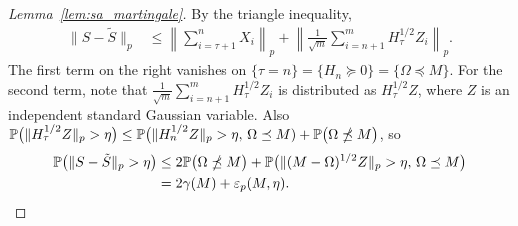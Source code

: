 \begin{proof}[Lemma~\ref{lem:sa_martingale}]
  By the triangle inequality,
  \begin{align*}
    \|S - \tilde S \|_p
    &\leq
    \left\| \sum_{i=\tau+1}^n  X_i \right\|_p
    + \left\| \frac{1}{\sqrt{m}} \sum_{i=n+1}^m H_\tau^{1/2} Z_i \right\|_p.
  \end{align*}
  The first term on the right vanishes on
  $\{\tau = n\} = \{H_n \succeq 0\} = \{\Omega \preceq M\}$.
  For the second term, note that
  $\tfrac{1}{\sqrt{m}}\sum_{i=n+1}^m H_\tau^{1/2} Z_i$
  is distributed as $H_\tau^{1/2}Z$,
  where $Z$ is an independent standard Gaussian variable.
  Also
  $\P\big( \| H_\tau^{1/2} Z \|_p > \eta \big)
  \leq \P\big( \| H_n^{1/2} Z \|_p > \eta,\, \Omega \preceq M)
  + \P\big( \Omega \npreceq M \big)$,
  so
  \begin{align*}%
    \nonumber
    \P\big( \| S - \tilde S \|_p > \eta\big)
    &\leq
    2 \P\big(\Omega \npreceq M \big)
    + \P\big( \| (M-\Omega)^{1/2}Z \|_p > \eta,\,
    \Omega \preceq M \big) \\
    \label{eq:approx_modified_original}
    &= 2 \gamma(M) + \varepsilon_p(M, \eta).
  \end{align*}



\end{proof}
